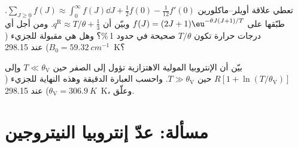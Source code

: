 \begin{exercise}[$\star\star\star$]\label{exo:b3:partition-functions:11}
تعطي علاقة أويلر--ماكلورين $\sum_{J\ge0}f(J) \approx \int_0^\infty f(J)\dd J + \frac12f(0) -
\frac1{12}f'(0)$. طبّقها على $f(J) = (2J+1)\eu^{-\theta J(J+1)/T}$ وبيّن أن $q^{\mathrm R} \approx T/\theta +
\frac13$. ومن أجل أي درجات حرارة تكون $T/\theta$ صحيحة في حدود 1\,\%؟ وهل هي مقبولة للجزيء 
($B_0 = \qty{59.32}{cm^{-1}}$) عند \qty{298.15}{K}؟
\end{exercise}

\begin{exercise}[$\star\star\star$]\label{exo:b3:partition-functions:12}
بيّن أن الإنتروبيا المولية الاهتزازية تؤول إلى الصفر حين $T \ll \theta_{\mathrm V}$ وإلى
$R[1 + \ln(T/\theta_{\mathrm V})]$ حين $T \gg \theta_{\mathrm V}$. واحسب العبارة الدقيقة وهذه
النهاية للجزيء  ($\theta_{\mathrm V} = \qty{306.9}{K}$) عند \qty{298.15}{K}، وعلّق.
\end{exercise}

\section{مسألة: عدّ إنتروبيا النيتروجين}

